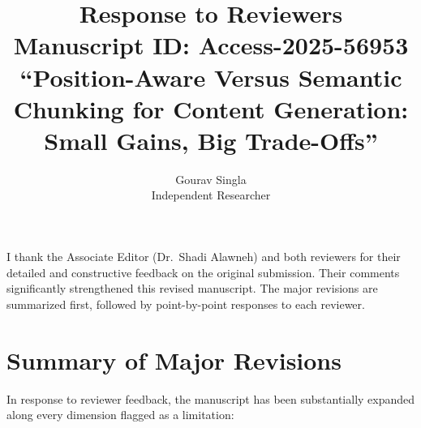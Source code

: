 \documentclass[11pt]{article}
\title{Response to Reviewers\\
\large Manuscript ID: Access-2025-56953\\
\normalsize ``Position-Aware Versus Semantic Chunking for Content Generation: Small Gains, Big Trade-Offs''}
\author{Gourav Singla\\\small Independent Researcher}
\date{}
\begin{document}
\maketitle

I thank the Associate Editor (Dr.~Shadi Alawneh) and both reviewers for their detailed and constructive feedback on the original submission. Their comments significantly strengthened this revised manuscript. The major revisions are summarized first, followed by point-by-point responses to each reviewer.

\section*{Summary of Major Revisions}

In response to reviewer feedback, the manuscript has been substantially expanded along every dimension flagged as a limitation:
\end{document}
